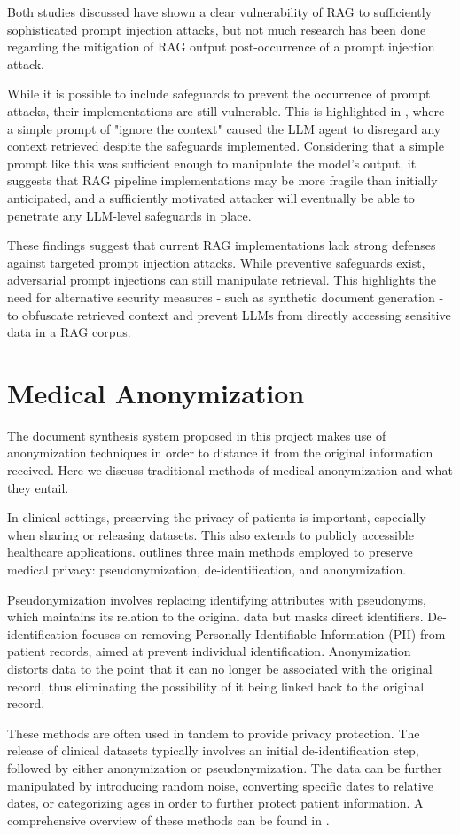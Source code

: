 Both studies discussed have shown a clear vulnerability of RAG to sufficiently sophisticated prompt injection attacks, but not much research has been done regarding the mitigation of RAG output post-occurrence of a prompt injection attack.

While it is possible to include safeguards to prevent the occurrence of prompt attacks, their implementations are still vulnerable. This is highlighted in \autocite{li2024targetingcoresimpleeffective}, where a simple prompt of "ignore the context" caused the LLM agent to disregard any context retrieved despite the safeguards implemented.
Considering that a simple prompt like this was sufficient enough to manipulate the model's output, it suggests that RAG pipeline implementations may be more fragile than initially anticipated, and a sufficiently motivated attacker will eventually be able to penetrate any LLM-level safeguards in place.

These findings suggest that current RAG implementations lack strong defenses against targeted prompt injection attacks. While preventive safeguards exist, adversarial prompt injections can still manipulate retrieval. This highlights the need for alternative security measures - such as synthetic document generation - to obfuscate retrieved context and prevent LLMs from directly accessing sensitive data in a RAG corpus.

\section{Medical Anonymization}
The document synthesis system proposed in this project makes use of anonymization techniques in order to distance it from the original information received. Here we discuss traditional methods of medical anonymization and what they entail.

In clinical settings, preserving the privacy of patients is important, especially when sharing or releasing datasets. This also extends to publicly accessible healthcare applications. \autocite{Rodriguez_Tuck_Dozier_Lewis_Eldridge_Jackson_Murray_Weir_2022} outlines three main methods employed to preserve medical privacy: pseudonymization, de-identification, and anonymization.

Pseudonymization involves replacing identifying attributes with pseudonyms, which maintains its relation to the original data but masks direct identifiers. De-identification focuses on removing Personally Identifiable Information (PII) from patient records, aimed at prevent individual identification. Anonymization distorts data to the point that it can no longer be associated with the original record, thus eliminating the possibility of it being linked back to the original record.

These methods are often used in tandem to provide privacy protection. The release of clinical datasets typically involves an initial de-identification step, followed by either anonymization or pseudonymization. The data can be further manipulated by introducing random noise, converting specific dates to relative dates, or categorizing ages in order to further protect patient information. A comprehensive overview of these methods can be found in \autocite{Rodriguez_Tuck_Dozier_Lewis_Eldridge_Jackson_Murray_Weir_2022}.
